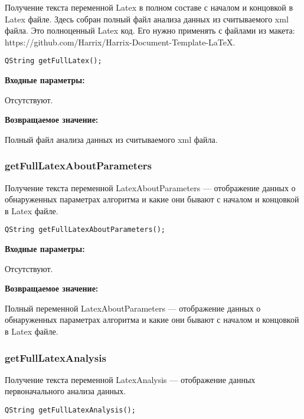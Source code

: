 Получение текста переменной Latex в полном составе с началом и концовкой в Latex файле. Здесь собран полный файл анализа данных из считываемого xml файла. Это полноценный Latex код. Его нужно применять с файлами из макета: https://github.com/Harrix/Harrix-Document-Template-LaTeX.


\begin{lstlisting}[label=code_syntax_getFullLatex,caption=Синтаксис]
QString getFullLatex();
\end{lstlisting}

\textbf{Входные параметры:}

Отсутствуют.

\textbf{Возвращаемое значение:}

Полный файл анализа данных из считываемого xml файла.


\subsubsection{getFullLatexAboutParameters}\label{getFullLatexAboutParameters}

Получение текста переменной LatexAboutParameters --- отображение данных о обнаруженных параметрах алгоритма и какие они бывают с началом и концовкой в Latex файле.


\begin{lstlisting}[label=code_syntax_getFullLatexAboutParameters,caption=Синтаксис]
QString getFullLatexAboutParameters();
\end{lstlisting}

\textbf{Входные параметры:}

Отсутствуют.

\textbf{Возвращаемое значение:}

Полный переменной LatexAboutParameters --- отображение данных о обнаруженных параметрах алгоритма и какие они бывают с началом и концовкой в Latex файле.


\subsubsection{getFullLatexAnalysis}\label{getFullLatexAnalysis}

Получение текста переменной LatexAnalysis --- отображение данных первоначального анализа данных.


\begin{lstlisting}[label=code_syntax_getFullLatexAnalysis,caption=Синтаксис]
QString getFullLatexAnalysis();
\end{lstlisting}

